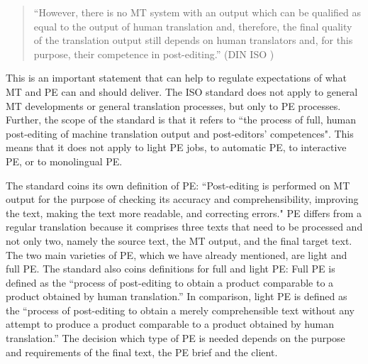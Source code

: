 \begin{quote}
“However, there is no MT system with an output which can be qualified as equal to the output of human translation and, therefore, the final quality of the translation output still depends on human translators and, for this purpose, their competence in post-editing.” (DIN ISO \citealt[Introduction]{din_iso_18587_ubersetzungsdienstleistungen_2018})  \end{quote}

This is an important statement that can help to regulate expectations of what MT and PE can and should deliver. The ISO standard does not apply to general MT developments or general translation processes, but only to PE processes. Further, the scope of the standard is that it refers to ``the process of full, human post-editing of machine translation output and post-editors’ competences". This means that it does not apply to light PE jobs, to automatic PE, to interactive PE, or to monolingual PE. 

The standard coins its own definition of PE: ``Post-editing is performed on MT output for the purpose of checking its accuracy and comprehensibility, improving the text, making the text more readable, and correcting errors." PE differs from a regular translation because it comprises three texts that need to be processed and not only two, namely the source text, the MT output, and the final target text. The two main varieties of PE, which we have already mentioned, are light and full PE. The standard also coins definitions for full and light PE: Full PE is defined as the “process of post-editing to obtain a product comparable to a product obtained by human translation.” In comparison, light PE is defined as the “process of post-editing to obtain a merely comprehensible text without any attempt to produce a product comparable to a product obtained by human translation.” The decision which type of PE is needed depends on the purpose and requirements of the final text, the PE brief and the client.

